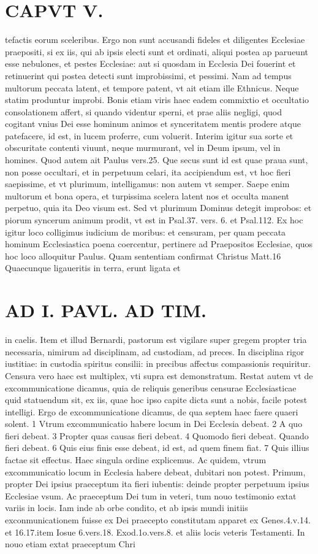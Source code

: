 \documentclass{article}
\begin{document}
\begin{pages}
\section*{CAPVT  V. }
\marginpar{[ p.383 ]}\pstart tefactis eorum sceleribus. Ergo non sunt accusandi fideles et diligentes Ecclesiae praepositi, si ex iis, qui ab ipsis electi sunt et ordinati, aliqui postea ap parueunt esse nebulones, et pestes Ecclesiae: aut si quosdam in Ecclesia Dei fouerint et retinuerint qui postea detecti sunt improbissimi, et pessimi. Nam ad tempus multorum peccata latent, et tempore patent, vt ait etiam ille Ethnicus. Neque statim produntur improbi. Bonis etiam viris haec eadem commixtio et occultatio consolationem affert, si quando videntur sperni, et prae aliis negligi, quod cogitant vnius Dei esse hominum animos et synceritatem mentis prodere atque patefacere, id est, in lucem proferre, cum voluerit. Interim igitur sua sorte et obscuritate contenti viuunt, neque murmurant, vel in Deum ipsum, vel in homines. Quod autem ait Paulus vers.25. Que secus sunt id est quae praua sunt, non posse occultari, et in perpetuum celari, ita accipiendum est, vt hoc fieri saepissime, et vt plurimum, intelligamus: non autem vt semper. Saepe enim multorum et bona opera, et turpissima scelera latent nos et occulta manent perpetuo, quia ita Deo visum est. Sed vt plurimum Dominus detegit improbos: et piorum syncerum animum prodit, vt est in Psal.37. vers. 6. et Psal.112. Ex hoc igitur loco colligimus iudicium de moribus: et censuram, per quam peccata hominum Ecclesiastica poena coercentur, pertinere ad Praepositos Ecclesiae, quos hoc loco alloquitur Paulus. Quam sententiam confirmat Christus Matt.16 Quaecunque ligaueritis in terra, erunt ligata et  \pend
\section*{AD I. PAVL. AD TIM. }
\marginpar{[ p.388 ]}\pstart in caelis. Item et illud Bernardi, pastorum est vigilare super gregem propter tria necessaria, nimirum ad disciplinam, ad custodiam, ad preces. In disciplina rigor iustitiae: in custodia spiritus consilii: in precibus affectus compassionis requiritur. Censura vero haec est multiplex, vti supra est demonstratum. Restat autem vt de excommunicatione dicamus, quia de reliquis generibus censurae Ecclesiasticae quid statuendum sit, ex iis, quae hoc ipso capite dicta sunt a nobis, facile potest intelligi. Ergo de excommunicatione dicamus, de qua septem haec faere quaeri solent. 1 Vtrum excommunicatio habere locum in Dei Ecclesia debeat. 2 A quo fieri debeat. 3 Propter quas causas fieri debeat. 4 Quomodo fieri debeat. Quando fieri debeat. 6 Quis eius finis esse debeat, id est, ad quem finem fiat. 7 Quis illius factae sit effectus. Haec singula ordine explicemus. Ac quidem, vtrum excommunicatio locum in Ecclesia habere debeat, dubitari non potest. Primum, propter Dei ipsius praeceptum ita fieri iubentis: deinde propter perpetuum ipsius Ecclesiae vsum. Ac praeceptum Dei tum in veteri, tum nouo testimonio extat variis in locis. Iam inde ab orbe condito, et ab ipsis mundi initiis exconmunicationem fuisse ex Dei praecepto constitutam apparet ex Genes.4.v.14. et 16.17.item Iosue 6.vers.18. Exod.1o.vers.8. et aliis locis veteris Testamenti. In nouo etiam extat praeceptum Chri\pend

\end{pages}
\end{document}
